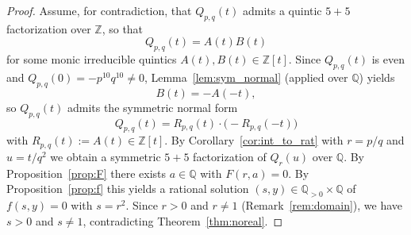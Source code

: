 \documentclass[10pt,a4paper]{amsart}
\begin{document}
\begin{proof}
Assume, for contradiction, that $Q_{p,q}(t)$ admits a quintic $5+5$ factorization over $\mathbb{Z}$, so that
\[
Q_{p,q}(t)=A(t)B(t)
\]
for some monic irreducible quintics $A(t),B(t)\in\mathbb{Z}[t]$.
Since $Q_{p,q}(t)$ is even and $Q_{p,q}(0)=-p^{10}q^{10}\neq 0$, Lemma~\ref{lem:sym_normal} (applied over $\mathbb{Q}$) yields
\[
B(t)=-A(-t),
\]
so $Q_{p,q}(t)$ admits the symmetric normal form
\[
Q_{p,q}(t)=R_{p,q}(t)\cdot\bigl(-R_{p,q}(-t)\bigr)
\]
with $R_{p,q}(t):=A(t)\in\mathbb{Z}[t]$.
By Corollary~\ref{cor:int_to_rat} with $r=p/q$ and $u=t/q^2$ we obtain a symmetric $5+5$ factorization of $Q_r(u)$ over $\mathbb{Q}$.
By Proposition~\ref{prop:F} there exists $a\in\mathbb{Q}$ with $F(r,a)=0$.
By Proposition~\ref{prop:f} this yields a rational solution $(s,y)\in\mathbb{Q}_{>0}\times\mathbb{Q}$ of $f(s,y)=0$ with $s=r^2$.
Since $r>0$ and $r\neq 1$ (Remark~\ref{rem:domain}), we have $s>0$ and $s\neq 1$, contradicting Theorem~\ref{thm:noreal}.
\end{proof}
\end{document}
